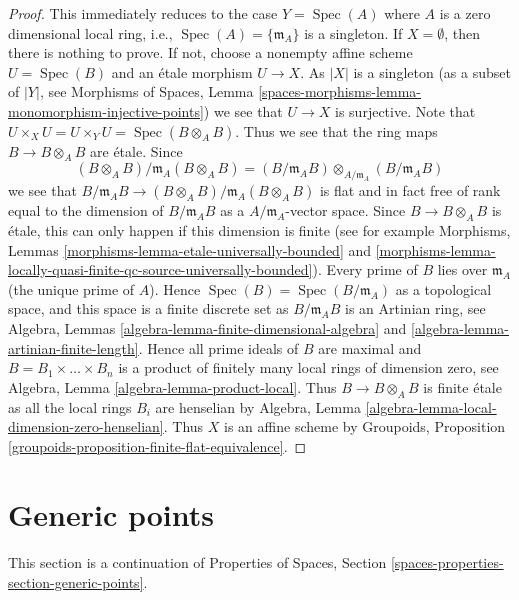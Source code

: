 \documentclass{stacks-project}
\theoremstyle{plain}
\theoremstyle{definition}
\theoremstyle{remark}
\numberwithin{equation}{subsection}
\def\Spec{\mathop{\mathrm{Spec}}}
\begin{document}
\begin{proof}
This immediately reduces to the case $Y = \Spec(A)$ where
$A$ is a zero dimensional local ring, i.e.,
$\Spec(A) = \{\mathfrak m_A\}$
is a singleton. If $X = \emptyset$, then there is nothing to prove.
If not, choose a nonempty affine scheme $U = \Spec(B)$
and an \'etale morphism $U \to X$. As $|X|$ is a singleton (as a
subset of $|Y|$, see
Morphisms of Spaces, Lemma
\ref{spaces-morphisms-lemma-monomorphism-injective-points})
we see that $U \to X$ is surjective. Note that
$U \times_X U = U \times_Y U = \Spec(B \otimes_A B)$.
Thus we see that the ring maps $B \to B \otimes_A B$ are \'etale.
Since
$$
(B \otimes_A B)/\mathfrak m_A(B \otimes_A B)
=
(B/\mathfrak m_AB) \otimes_{A/\mathfrak m_A} (B/\mathfrak m_AB)
$$
we see that
$B/\mathfrak m_AB \to (B \otimes_A B)/\mathfrak m_A(B \otimes_A B)$
is flat and in fact free of rank equal to the dimension of
$B/\mathfrak m_AB$ as a $A/\mathfrak m_A$-vector space. Since
$B \to B \otimes_A B$ is \'etale, this can only happen if this
dimension is finite (see for example
Morphisms, Lemmas \ref{morphisms-lemma-etale-universally-bounded} and
\ref{morphisms-lemma-locally-quasi-finite-qc-source-universally-bounded}).
Every prime of $B$ lies over $\mathfrak m_A$ (the unique prime of $A$).
Hence $\Spec(B) = \Spec(B/\mathfrak m_A)$ as a topological
space, and this space is a finite discrete set as $B/\mathfrak m_A B$
is an Artinian ring, see
Algebra, Lemmas \ref{algebra-lemma-finite-dimensional-algebra} and
\ref{algebra-lemma-artinian-finite-length}.
Hence all prime ideals of $B$ are maximal and
$B = B_1 \times \ldots \times B_n$ is a product of finitely many
local rings of dimension zero, see
Algebra, Lemma \ref{algebra-lemma-product-local}.
Thus $B \to B \otimes_A B$ is finite \'etale as all the local rings
$B_i$ are henselian by
Algebra, Lemma \ref{algebra-lemma-local-dimension-zero-henselian}.
Thus $X$ is an affine scheme by
Groupoids, Proposition \ref{groupoids-proposition-finite-flat-equivalence}.
\end{proof}








\section{Generic points}
\label{section-generic-points}

\noindent
This section is a continuation of
Properties of Spaces, Section \ref{spaces-properties-section-generic-points}.
\end{document}
